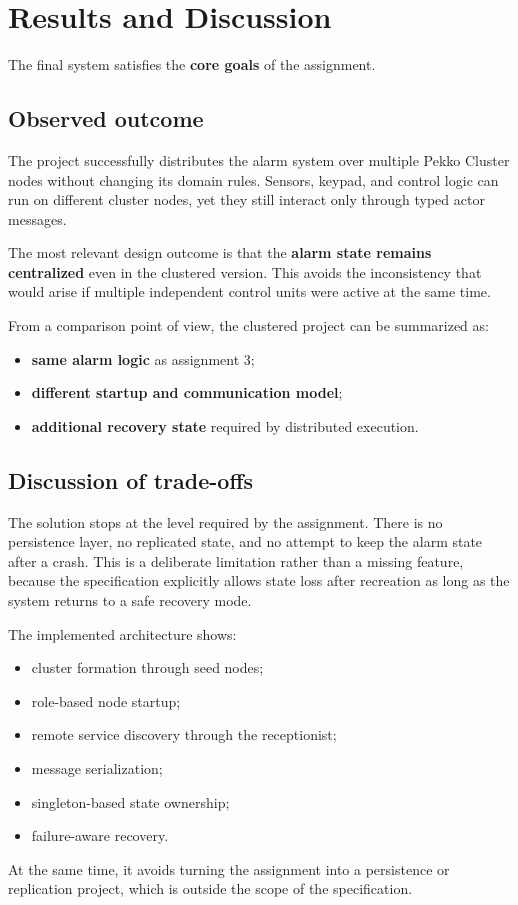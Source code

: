 \clearpage
\section{Results and Discussion}

The final system satisfies the \textbf{core goals} of the assignment.

\subsection{Observed outcome}

The project successfully distributes the alarm system over multiple Pekko
Cluster nodes without changing its domain rules. Sensors, keypad, and control
logic can run on different cluster nodes, yet they still interact only through typed
actor messages.

The most relevant design outcome is that the \textbf{alarm state remains
centralized} even in the clustered version. This avoids the inconsistency that
would arise if multiple independent control units were active at the same
time.

From a comparison point of view, the clustered project can be summarized as:
\begin{itemize}
    \item \textbf{same alarm logic} as assignment 3;
    \item \textbf{different startup and communication model};
    \item \textbf{additional recovery state} required by distributed execution.
\end{itemize}

\subsection{Discussion of trade-offs}

The solution stops at the level required by the assignment.
There is no persistence layer, no replicated state, and no attempt to keep the
alarm state after a crash. This is a deliberate limitation rather than a
missing feature, because the specification explicitly allows state loss after
recreation as long as the system returns to a safe recovery mode.

The implemented architecture shows:

\begin{itemize}
    \item cluster formation through seed nodes;
    \item role-based node startup;
    \item remote service discovery through the receptionist;
    \item message serialization;
    \item singleton-based state ownership;
    \item failure-aware recovery.
\end{itemize}

At the same time, it avoids turning the assignment into a persistence or
replication project, which is outside the scope of the specification.
